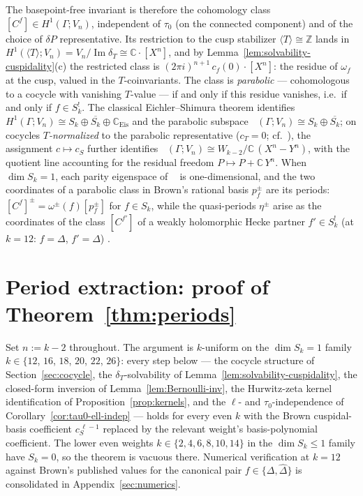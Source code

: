\documentclass[11pt]{article}
\numberwithin{equation}{section}  %
\newcommand{\ZZ}{\mathbb{Z}}
\newcommand{\CC}{\mathbb{C}}
\newcommand{\Dhat}{\widehat{\Delta}}
\DeclareMathOperator{\im}{Im}
\DeclareMathOperator{\Hpar}{H^1_{\mathrm{par}}}
\begin{document}
The basepoint-free invariant is therefore the cohomology class
$[C^f] \in H^1(\Gamma; V_n)$, independent of $\tau_0$ (on the connected
component) and of the choice of $\delta P$ representative.  Its restriction to the cusp stabilizer
$\langle T \rangle \cong \ZZ$ lands in
$H^1(\langle T \rangle; V_n) = V_n / \im \delta_T \cong \CC\cdot[X^n]$,
and by Lemma~\ref{lem:solvability-cuspidality}(c) the restricted class is
$(2\pi i)^{n+1}\, c_f(0) \cdot [X^n]$: the residue of $\omega_f$ at the
cusp, valued in the $T$-coinvariants.  The class is \emph{parabolic} ---
cohomologous to a cocycle with vanishing $T$-value --- if and only if
this residue vanishes, i.e.\ if and only if $f \in S^!_k$.  The classical
Eichler--Shimura theorem \cite{KZ1984} identifies
$H^1(\Gamma; V_n) \cong S_k \oplus \overline{S_k} \oplus
\CC_{\mathrm{Eis}}$ and the parabolic subspace
$\Hpar(\Gamma; V_n) \cong S_k \oplus \overline{S_k}$; on cocycles
\emph{$T$-normalized} to the parabolic representative ($c_T = 0$; cf.\ \cite[\S2.2]{BCD2018}), the assignment $c \mapsto c_S$ further
identifies $\Hpar(\Gamma; V_n) \cong W_{k-2}/\CC\,(X^n - Y^n)$, with the
quotient line accounting for the residual freedom
$P \mapsto P + \CC\, Y^n$.  When $\dim S_k = 1$, each parity eigenspace
of $\Hpar$ is one-dimensional, and the two coordinates of a parabolic
class in Brown's rational basis $p^\pm_f$ are its periods:
$[C^f]^\pm = \omega^\pm(f)[p^\pm_f]$ for $f \in S_k$, while the
quasi-periods $\eta^\pm$ arise as the coordinates of the class
$[C^{f'}]$ of a weakly holomorphic Hecke partner $f' \in S^!_k$ (at
$k = 12$: $f = \Delta$, $f' = \Dhat$)
\cite{Brown2017}. %


\section{Period extraction: proof of Theorem~\ref{thm:periods}}\label{sec:periods}

Set $n := k - 2$ throughout.  The argument is $k$-uniform on the
$\dim S_k = 1$ family $k \in \{12$, $16$, $18$, $20$, $22$, $26\}$: every step
below --- the cocycle structure of Section~\ref{sec:cocycle}, the
$\delta_T$-solvability of Lemma~\ref{lem:solvability-cuspidality},
the closed-form inversion of
Lemma~\ref{lem:Bernoulli-inv}, the Hurwitz-zeta kernel
identification of Proposition~\ref{prop:kernels}, and the
$\ell$- and $\tau_0$-independence of Corollary~\ref{cor:tau0-ell-indep} ---
holds for every even $k$ with
the Brown cuspidal-basis coefficient $c_S^{\,\ell - 1}$ replaced by the
relevant weight's basis-polynomial coefficient.  The lower even weights
$k \in \{2, 4, 6, 8, 10, 14\}$ in the $\dim S_k \le 1$ family have
$S_k = 0$, so the theorem is vacuous there.  Numerical verification at
$k = 12$ against Brown's published values for the canonical pair
$f \in \{\Delta, \Dhat\}$ is consolidated in
Appendix~\ref{sec:numerics}.
\end{document}
